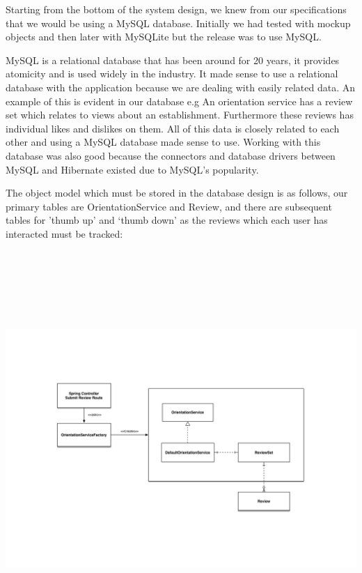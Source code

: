 Starting from the bottom of the system design, we knew from our specifications that we would be using a MySQL database. Initially we had tested with mockup objects and then later with MySQLite but the release was to use MySQL. \newline 

\noindent MySQL is a relational database that has been around for 20 years, it provides atomicity and is used widely in the industry. It made sense to use a relational database with the application because we are dealing with easily related data. An example of this is evident in our database e.g An orientation service has a review set which relates to views about an establishment. Furthermore these reviews has individual likes and dislikes on them. All of this data is closely related to each other and using a MySQL database made sense to use. Working with this database was also good because the connectors and database drivers between MySQL and Hibernate existed due to MySQL's popularity. \newline

\noindent The object model which must be stored in the database design is as follows, our primary tables are OrientationService and Review, and there are subsequent tables for 'thumb up' and `thumb down' as the reviews which each user has interacted must be tracked:

\begin{center}    
	\includegraphics[height=15cm, width=15cm]{img/objectModel.png}
\end{center}

